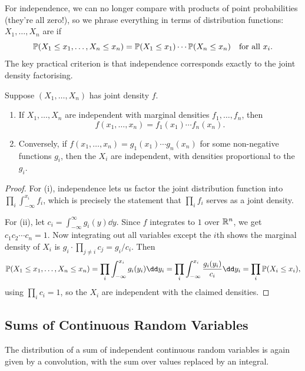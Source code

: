 \documentclass[a4paper]{scrartcl}
\begin{document}
For independence, we can no longer compare with products of point probabilities (they're all zero!), so we phrase everything in terms of distribution functions: $X_1, \dots, X_n$ are  if
$$
\mathbb{P}(X_1 \leq x_1, \dots, X_n \leq x_n) = \mathbb{P}(X_1 \leq x_1) \cdots \mathbb{P}(X_n \leq x_n) \quad \text{for all } x_i.
$$
The key practical criterion is that independence corresponds exactly to the joint density factorising.

\begin{theorem}
	Suppose $(X_1, \dots, X_n)$ has joint density $f$.
	\begin{enumerate}[label=(\roman*)]
		\item If $X_1, \dots, X_n$ are independent with marginal densities $f_1, \dots, f_n$, then
		$$
		f(x_1, \dots, x_n) = f_1(x_1)\cdots f_n(x_n).
		$$
		\item Conversely, if $f(x_1, \dots, x_n) = g_1(x_1) \cdots g_n(x_n)$ for some non-negative functions $g_i$, then the $X_i$ are independent, with densities proportional to the $g_i$.
	\end{enumerate}
\end{theorem}
\begin{proof}
	For (i), independence lets us factor the joint distribution function into $\prod_i \int_{-\infty}^{x_i} f_i$, which is precisely the statement that $\prod_i f_i$ serves as a joint density.

	For (ii), let $c_i = \int_{-\infty}^{\infty} g_i(y)\dd y$. Since $f$ integrates to $1$ over $\mathbb{R}^n$, we get $c_1 c_2 \cdots c_n = 1$. Now integrating out all variables except the $i$th shows the marginal density of $X_i$ is $g_i \cdot \prod_{j \neq i} c_j = g_i / c_i$. Then
	$$
	\PP(X_1 \leq x_1, \dots, X_n \leq x_n) = \prod_{i} \int_{-\infty}^{x_i} g_i(y_i) \dd y_i = \prod_i \int_{-\infty}^{x_i} \frac{g_i(y_i)}{c_i}\dd y_i = \prod_i \PP(X_i \leq x_i),
	$$
	using $\prod_i c_i = 1$, so the $X_i$ are independent with the claimed densities.
\end{proof}

\subsection{Sums of Continuous Random Variables}

The distribution of a sum of independent continuous random variables is again given by a convolution, with the sum over values replaced by an integral.
\end{document}
